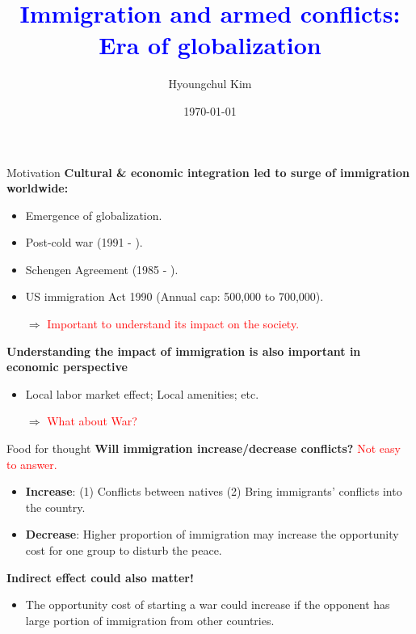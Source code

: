 \documentclass[notes,11pt, aspectratio=169]{beamer}
\title{\textcolor{blue}{Immigration and armed conflicts: Era of globalization}}
\author{Hyoungchul Kim}
\institute{Wharton UPenn}
\date{\today}
\begin{document}
\begin{frame}[plain]
	\titlepage
\end{frame}

\setcounter{framenumber}{0}

\begin{frame}{Motivation}
	\textbf{Cultural \& economic integration led to surge of immigration worldwide:}
	\begin{itemize}
		\item Emergence of globalization.
		\item Post-cold war (1991 - ). 
		\item Schengen Agreement (1985 - ).
		\item US immigration Act 1990 (Annual cap: 500,000 to 700,000).
		\item[$\Rightarrow$] \textcolor{red}{Important to understand its impact on the society.}
	\end{itemize}\vspace{1em}

	\textbf{Understanding the impact of immigration is also important in economic perspective}
	\begin{itemize}
		\item Local labor market effect; Local amenities; etc.
		\item [$\Rightarrow$] \textcolor{red}{What about War?}
	\end{itemize}

\end{frame}

\begin{frame}{Food for thought}
	\textbf{Will immigration increase/decrease conflicts?} \textcolor{red}{Not easy to answer.}	
	\begin{itemize}
		\item \textbf{Increase}: (1) Conflicts between natives (2) Bring immigrants' conflicts into the country.  
		\item \textbf{Decrease}: Higher proportion of immigration may increase the opportunity cost for one group to disturb the peace.
	\end{itemize}\vspace{1em}

	\textbf{Indirect effect could also matter!}
	\begin{itemize}
		\item The opportunity cost of starting a war could increase if the opponent has large portion of immigration from other countries.
	\end{itemize}
\end{frame}
\end{document}
